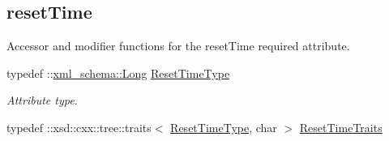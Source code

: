 \subsection*{resetTime}
\label{_amgrp46a8dfac6df9ff95c1068bf0eb4b2065}
Accessor and modifier functions for the resetTime required attribute. \begin{DoxyCompactItemize}
\item 
\hypertarget{classopenstack_1_1xml_1_1RateLimit_a040904fe6210dfa7070906275285989b}{
typedef ::\hyperlink{namespacexml__schema_a516206ea7b60d1854f758b122bde2f5d}{xml\_\-schema::Long} \hyperlink{classopenstack_1_1xml_1_1RateLimit_a040904fe6210dfa7070906275285989b}{ResetTimeType}}
\label{classopenstack_1_1xml_1_1RateLimit_a040904fe6210dfa7070906275285989b}

\begin{DoxyCompactList}\small\item\em Attribute type. \item\end{DoxyCompactList}\item 
\hypertarget{classopenstack_1_1xml_1_1RateLimit_a3faae34db835d0cd785d8ac14172cec0}{
typedef ::xsd::cxx::tree::traits$<$ \hyperlink{classopenstack_1_1xml_1_1RateLimit_a040904fe6210dfa7070906275285989b}{ResetTimeType}, char $>$ \hyperlink{classopenstack_1_1xml_1_1RateLimit_a3faae34db835d0cd785d8ac14172cec0}{ResetTimeTraits}}
\label{classopenstack_1_1xml_1_1RateLimit_a3faae34db835d0cd785d8ac14172cec0}


\end{DoxyCompactItemize}
